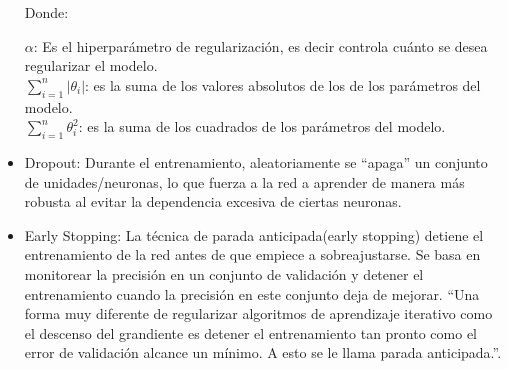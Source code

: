 \begin{itemize}
Donde: 
		
		$\alpha $: Es el hiperparámetro de regularización, es decir controla cuánto se desea regularizar el modelo.\\
		$\sum_{i=1}^{n} \left |  \theta_i \right | $:  es la suma de los valores absolutos de los de los parámetros del modelo.\\
		$\sum_{i=1}^{n} \theta_i^2 $: es la suma de los cuadrados de los parámetros del modelo.\\
		
	\item Dropout: Durante el entrenamiento, aleatoriamente se ``apaga'' un conjunto de unidades/neuronas, lo que fuerza a la red a aprender de manera más robusta al evitar la dependencia excesiva de ciertas neuronas.
	
	\item Early Stopping:  La técnica de parada anticipada(early stopping) detiene el entrenamiento de la red antes de que empiece a sobreajustarse. Se basa en monitorear la precisión en un conjunto de validación y detener el entrenamiento cuando la precisión en este conjunto deja de mejorar. ``Una forma muy diferente de regularizar algoritmos de aprendizaje iterativo como el descenso del grandiente es detener el entrenamiento tan pronto como el error de validación alcance un mínimo. A esto se le llama parada anticipada.''\cite[p. 142]{geron2019hands}.
	
\end{itemize}